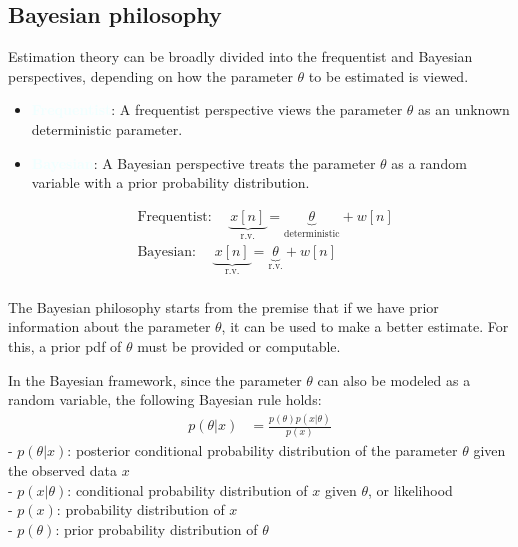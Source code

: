 \documentclass[10pt]{article}
\newcommand{\textbfazure}[1]{\textcolor{azure}{\textbf{#1}}}
\begin{document}
\subsection{Bayesian philosophy}
Estimation theory can be broadly divided into the frequentist and Bayesian perspectives, depending on how the parameter $\theta$ to be estimated is viewed.
\begin{itemize}
	\item \textbfazure{Frequentist}: A frequentist perspective views the parameter $\theta$ as an unknown deterministic parameter.
	\item \textbfazure{Bayesian}: A Bayesian perspective treats the parameter $\theta$ as a random variable with a prior probability distribution.
\end{itemize}

\begin{equation}   
	\begin{aligned}  
		& \text{Frequentist: } \quad \underbrace{x[n]}_{\text{r.v.}} = \underbrace{\theta}_{\text{deterministic}}+ w[n] \\  
		& \text{Bayesian: } \quad \underbrace{x[n]}_{\text{r.v.}} = \underbrace{\theta}_{\text{r.v.}} + w[n] \\  
	\end{aligned}   
\end{equation}

The Bayesian philosophy starts from the premise that if we have prior information about the parameter $\theta$, it can be used to make a better estimate. For this, a prior pdf of $\theta$ must be provided or computable.

In the Bayesian framework, since the parameter $\theta$ can also be modeled as a random variable, the following Bayesian rule holds:
\begin{equation}
	\begin{aligned}
		p(\theta|x) &  = \frac{p(\theta) p(x|\theta)}{p(x)}
	\end{aligned}
\end{equation}
- $p(\theta|x)$: posterior conditional probability distribution of the parameter $\theta$ given the observed data $x$\\
- $p(x|\theta)$: conditional probability distribution of $x$ given $\theta$, or likelihood\\
- $p(x)$: probability distribution of $x$\\
- $p(\theta)$: prior probability distribution of $\theta$\\
\end{document}
